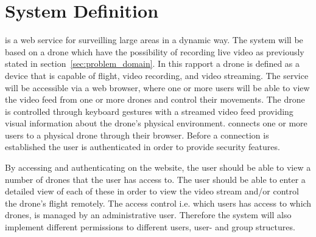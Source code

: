 \section{System Definition}
\projectname{} is a web service for surveilling large areas in a dynamic way. 
The system will be based on a drone which have the possibility of recording live video as previously stated in section~\ref{sec:problem_domain}.
In this rapport a drone is defined as a device that is capable of flight, video recording, and video streaming.
The service will be accessible via a web browser, where one or more users will be able to view the video feed from one or more drones and control their movements. 
The drone is controlled through keyboard gestures with a streamed video feed providing visual information about the drone's physical environment. 
\projectname{} connects one or more users to a physical drone through their browser. 
Before a connection is established the user is authenticated in order to provide security features.

By accessing and authenticating on the website, the user should be able to view a number of drones that the user has access to.
The user should be able to enter a detailed view of each of these in order to view the video stream and/or control the drone's flight remotely. 
The access control i.e. which users has access to which drones, is managed by an administrative user.
Therefore the system will also implement different permissions to different users, user- and group structures. %
